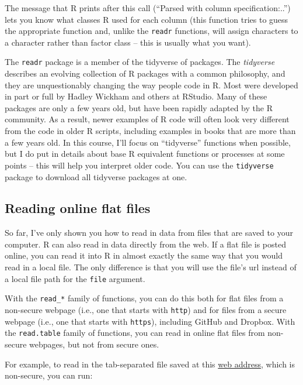 \documentclass[]{book}
\makeatletter
\newenvironment{kframe}{%
\medskip{}
\setlength{\fboxsep}{.8em}
 \def\at@end@of@kframe{}%
 \ifinner\ifhmode%
  \def\at@end@of@kframe{\end{minipage}}%
  \begin{minipage}{\columnwidth}%
 \fi\fi%
 \def\FrameCommand##1{\hskip\@totalleftmargin \hskip-\fboxsep
 \colorbox{shadecolor}{##1}\hskip-\fboxsep
     \hskip-\linewidth \hskip-\@totalleftmargin \hskip\columnwidth}%
 \MakeFramed {\advance\hsize-\width
   \@totalleftmargin\z@ \linewidth\hsize
   \@setminipage}}%
 {\par\unskip\endMakeFramed%
 \at@end@of@kframe}
\newenvironment{rmdblock}[1]
  {
  \begin{itemize}
  \renewcommand{\labelitemi}{
    \raisebox{-.7\height}[0pt][0pt]{
      {\setkeys{Gin}{width=3em,keepaspectratio}\texttt{[image: images/\#1]}}
    }
  }
  \setlength{\fboxsep}{1em}
  \begin{kframe}
  \item
  }
  {
  \end{kframe}
  \end{itemize}
  }
\newenvironment{rmdnote}
  {\begin{rmdblock}{note}}
  {\end{rmdblock}}
\theoremstyle{definition}
\theoremstyle{definition}
\theoremstyle{definition}
\theoremstyle{remark}
\makeatother
\begin{document}
The message that R prints after this call (``Parsed with column
specification:..'') lets you know what classes R used for each column
(this function tries to guess the appropriate function and, unlike the
\texttt{readr} functions, will assign characters to a character rather
than factor class -- this is usually what you want).

\begin{rmdnote}
The \texttt{readr} package is a member of the tidyverse of packages. The
\emph{tidyverse} describes an evolving collection of R packages with a
common philosophy, and they are unquestionably changing the way people
code in R. Most were developed in part or full by Hadley Wickham and
others at RStudio. Many of these packages are only a few years old, but
have been rapidly adapted by the R community. As a result, newer
examples of R code will often look very different from the code in older
R scripts, including examples in books that are more than a few years
old. In this course, I'll focus on ``tidyverse'' functions when
possible, but I do put in details about base R equivalent functions or
processes at some points -- this will help you interpret older code. You
can use the \texttt{tidyverse} package to download all tidyverse
packages at one.
\end{rmdnote}

\subsection{Reading online flat files}\label{reading-online-flat-files}

So far, I've only shown you how to read in data from files that are
saved to your computer. R can also read in data directly from the web.
If a flat file is posted online, you can read it into R in almost
exactly the same way that you would read in a local file. The only
difference is that you will use the file's url instead of a local file
path for the \texttt{file} argument.

With the \texttt{read\_*} family of functions, you can do this both for
flat files from a non-secure webpage (i.e., one that starts with
\texttt{http}) and for files from a secure webpage (i.e., one that
starts with \texttt{https}), including GitHub and Dropbox. With the
\texttt{read.table} family of functions, you can read in online flat
files from non-secure webpages, but not from secure ones.

For example, to read in the tab-separated file saved at this
\href{http://www2.unil.ch/comparativegenometrics/docs/NC_006368.txt}{web
address}, which is non-secure, you can run:
\end{document}
